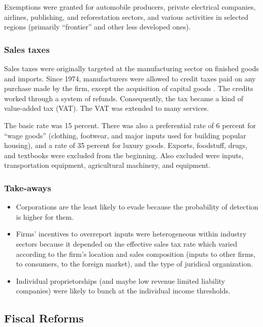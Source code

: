 \documentclass[
  12pt]{article}
\providecommand{\tightlist}{%
  \setlength{\itemsep}{0pt}\setlength{\parskip}{0pt}}\usepackage{longtable,booktabs,array}
\theoremstyle{definition}
\theoremstyle{remark}
\begin{document}
Exemptions were granted for automobile producers, private electrical
companies, airlines, publishing, and reforestation sectors, and various
activities in selected regions (primarily ``frontier'' and other less
developed ones).

\subsubsection{Sales taxes}\label{sales-taxes}

Sales taxes were originally targeted at the manufacturing sector on
finished goods and imports. Since 1974, manufacturers were allowed to
credit taxes paid on any purchase made by the firm, except the
acquisition of capital goods \citep{Perry1990}. The credits worked
through a system of refunds. Consequently, the tax became a kind of
value-added tax (VAT). The VAT was extended to many services.

The basic rate was 15 percent. There was also a preferential rate of 6
percent for ``wage goods'' (clothing, footwear, and major inputs used
for building popular housing), and a rate of 35 percent for luxury
goods. Exports, foodstuff, drugs, and textbooks were excluded from the
beginning. Also excluded were inputs, transportation equipment,
agricultural machinery, and equipment.

\subsubsection{Take-aways}\label{take-aways}

\begin{itemize}
\tightlist
\item
  Corporations are the least likely to evade because the probability of
  detection is higher for them.
\item
  Firms' incentives to overreport inputs were heterogeneous within
  industry sectors because it depended on the effective sales tax rate
  which varied according to the firm's location and sales composition
  (inputs to other firms, to consumers, to the foreign market), and the
  type of juridical organization.
\item
  Individual proprietorships (and maybe low revenue limited liability
  companies) were likely to bunch at the individual income thresholds.
\end{itemize}

\subsection{Fiscal Reforms}\label{fiscal-reforms}
\end{document}
